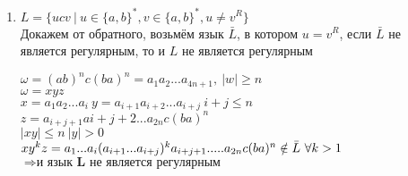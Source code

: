 \documentclass{article}
\begin{document}
\begin{enumerate}
            \item $L = \{ucv \ | \ u \in \{a,b\}^*, v \in \{a,b\}^*, u \neq v^R \}$ \\
            Докажем от обратного, возьмём язык $\bar L$, в котором $u = v^R$, если $\bar L$
            не является регулярным, то и $L$ не является регулярным
                \begin{center}
                    $\omega = (ab)^n c (ba)^n = a_1a_2...a_{4n+1}, \ |w| \geq n$ \\
                    $\omega = xyz$ \\
                    $x = a_1a_2...a_i \ y = a_{i+1}a_{i+2}...a_{i+j} \ i + j \leq n$ \\
                    $z = a_{i+j+1}a{i+j+2}...a_{2n}c(ba)^n$ \\
                    $|xy| \leq n \ |y| > 0$ \\
                    $xy^kz = a_1...a_i(a_{i+1}...a_{i+j})^k a_{i+j+1}...\\ ..a_{2n}c(ba)^n \notin \bar L \ \forall k > 1$\\
                    $\Rightarrow \textbf{и язык L не является регулярным}$
                \end{center}
        
        \end{enumerate}
    
    
\end{document}

